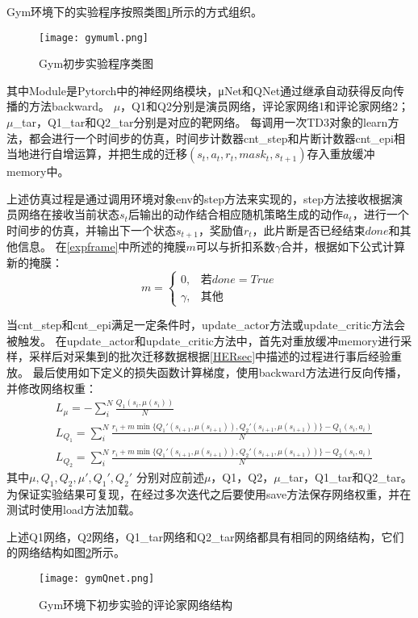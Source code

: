 Gym环境下的实验程序按照类图\ref{gymuml}所示的方式组织。
    \begin{figure}[htpb]
        \centering
        \texttt{[image: gymuml.png]}
        \caption{Gym初步实验程序类图}
        \label{gymuml}
    \end{figure}
其中Module是Pytorch中的神经网络模块，μNet和QNet通过继承自动获得反向传播的方法backward。
$\mu$，Q1和Q2分别是演员网络，评论家网络1和评论家网络2；$\mu$\_tar，Q1\_tar和Q2\_tar分别是对应的靶网络。
每调用一次TD3对象的learn方法，都会进行一个时间步的仿真，时间步计数器cnt\_step和片断计数器cnt\_epi相当地进行自增运算，并把生成的迁移$(s_t,a_t,r_t,mask_t,s_{t+1})$存入重放缓冲memory中。

上述仿真过程是通过调用环境对象env的step方法来实现的，step方法接收根据演员网络在接收当前状态$s_t$后输出的动作结合相应随机策略生成的动作$a_t$，进行一个时间步的仿真，并输出下一个状态$s_{t+1}$，奖励值$r_t$，此片断是否已经结束$done$和其他信息。
在\ref{expframe}中所述的掩膜$m$可以与折扣系数$\gamma$合并，根据如下公式计算新的掩膜：
\[
m=\begin{cases}
          0, & \text{若} done=True \\
          \gamma, & \text{其他}
\end{cases}
\]

当cnt\_step和cnt\_epi满足一定条件时，update\_actor方法或update\_critic方法会被触发。
在update\_actor和update\_critic方法中，首先对重放缓冲memory进行采样，采样后对采集到的批次迁移数据根据\ref{HERsec}中描述的过程进行事后经验重放。
最后使用如下定义的损失函数计算梯度，使用backward方法进行反向传播，并修改网络权重：
\begin{align}
    & L_\mu = -\sum_i^N\frac{Q_1(s_i, \mu(s_i))}{N} \\
    & L_{Q_1} = \sum_i^N\frac{r_i + m \min\{Q_1'(s_{i+1},\mu(s_{i+1})), Q_2'(s_{i+1},\mu(s_{i+1}))\} - Q_1(s_i,a_i)}{N}\\
    & L_{Q_2} = \sum_i^N\frac{r_i + m \min\{Q_1'(s_{i+1},\mu(s_{i+1})), Q_2'(s_{i+1},\mu(s_{i+1}))\} - Q_2(s_i,a_i)}{N}
\end{align}
其中$\mu, Q_1, Q_2, \mu', Q_1',Q_2'$ 分别对应前述$\mu$，Q1，Q2，$\mu$\_tar，Q1\_tar和Q2\_tar。
为保证实验结果可复现，在经过多次迭代之后要使用save方法保存网络权重，并在测试时使用load方法加载。

上述Q1网络，Q2网络，Q1\_tar网络和Q2\_tar网络都具有相同的网络结构，它们的网络结构如图\ref{gymQnet}所示。

    \begin{figure}[htpb]
        \centering
        \texttt{[image: gymQnet.png]}
        \caption{Gym环境下初步实验的评论家网络结构}
        \label{gymQnet}
    \end{figure}

